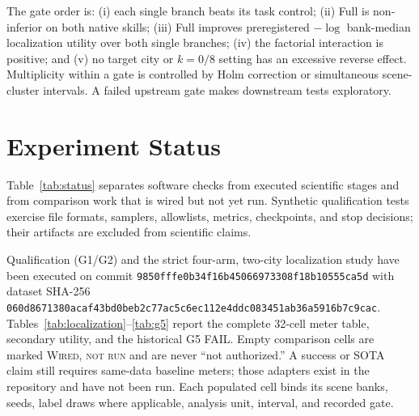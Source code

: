 \documentclass{article}
\newcommand{\wired}{\textsc{Wired, not run}}
\begin{document}
The gate order is: (i) each single branch beats its task control; (ii) Full is
non-inferior on both native skills; (iii) Full improves preregistered
$-\log$ bank-median localization utility over both single branches; (iv) the
factorial interaction is positive; and (v) no target city or $k=0/8$ setting
has an excessive reverse effect.  Multiplicity within a gate is controlled by
Holm correction or simultaneous scene-cluster intervals.  A failed upstream
gate makes downstream tests exploratory.

\section{Experiment Status}

Table~\ref{tab:status} separates software checks from executed scientific
stages and from comparison work that is wired but not yet run.  Synthetic
qualification tests exercise file formats, samplers, allowlists, metrics,
checkpoints, and stop decisions; their artifacts are excluded from scientific
claims.

Qualification (G1/G2) and the strict four-arm, two-city localization study
have been executed on commit
\texttt{9850fffe0b34f16b45066973308f18b10555ca5d} with dataset SHA-256
\texttt{060d8671380acaf43bd0beb2c77ac5c6ec112e4ddc083451ab36a5916b7c9cac}.
Tables~\ref{tab:localization}--\ref{tab:g5} report the complete 32-cell
meter table, secondary utility, and the historical G5 FAIL.  Empty
comparison cells are marked \wired{} and are never ``not authorized.''
A success or SOTA claim still requires same-data baseline meters; those
adapters exist in the repository and have not been run.  Each populated
cell binds its scene banks, seeds, label draws where applicable, analysis
unit, interval, and recorded gate.
\end{document}

